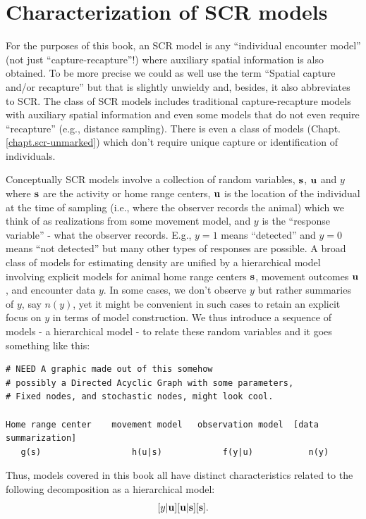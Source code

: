 \section{Characterization of SCR models}
\label{modeling.sec.characterization}

For the purposes of this book, an SCR model is any ``individual
encounter model'' (not just ``capture-recapture''!) where auxiliary
spatial information is also obtained. To be more precise we could as
well use the term ``Spatial capture and/or recapture'' but that is
slightly unwieldy and, besides, it also abbreviates to SCR. The class
of SCR models includes traditional capture-recapture models with
auxiliary spatial information and even some
models that do not even require ``recapture'' (e.g., distance
sampling).  There is even a class of models (Chapt. \ref{chapt.scr-unmarked})
which don't require unique capture or
identification of individuals.

Conceptually SCR models involve a collection of random
variables, ${\bf s}$, ${\bf u}$ and $y$ where ${\bf s}$ are the
activity or home range centers, ${\bf u}$ is the location of the
individual at the time of sampling (i.e., where the observer records
the animal) which we think of as realizations from some movement
model, and $y$ is the ``response variable'' - what the observer
records. E.g., $y=1$ means ``detected'' and $y=0$ means ``not
detected'' but many other types of responses are possible.
A broad class of models for estimating density are unified by a
hierarchical model involving explicit models for
animal home range centers ${\bf s}$, movement outcomes ${\bf u}$, and
encounter data $y$.  In some cases, we don't observe $y$ but rather
summaries of $y$, say $n(y)$, yet it might be convenient in such cases
to retain an explicit focus on $y$ in terms of model construction.
We thus introduce a sequence of models - a hierarchical model -
to relate these random variables and it goes something like this:
{\small
\begin{verbatim}
# NEED A graphic made out of this somehow
# possibly a Directed Acyclic Graph with some parameters,
# Fixed nodes, and stochastic nodes, might look cool.

Home range center    movement model   observation model  [data summarization]
   g(s)                  h(u|s)            f(y|u)	        n(y)
\end{verbatim}
}
Thus, models covered in this book all have distinct
characteristics related to the following decomposition as a
hierarchical model:
\[
[y|{\bf u}][{\bf u}|{\bf s}][{\bf s}].
\]

